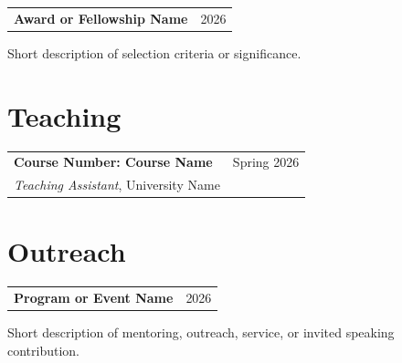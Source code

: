 \documentclass[margin,line]{res}
\begin{document}
\begin{resume}
\begin{tabularx}{\textwidth}{@{}X r@{}}
\textbf{Award or Fellowship Name} & {2026} \\
\end{tabularx}
Short description of selection criteria or significance.

\section{\sc Teaching}

\begin{tabularx}{\textwidth}{@{}X r@{}}
\textbf{Course Number: Course Name} & {Spring 2026} \\
\emph{Teaching Assistant}, University Name &  \\
\end{tabularx}

\section{\sc Outreach}

\begin{tabularx}{\textwidth}{@{}X r@{}}
\textbf{Program or Event Name} & {2026} \\
\end{tabularx}
Short description of mentoring, outreach, service, or invited speaking contribution.

\end{resume}
\end{document}
